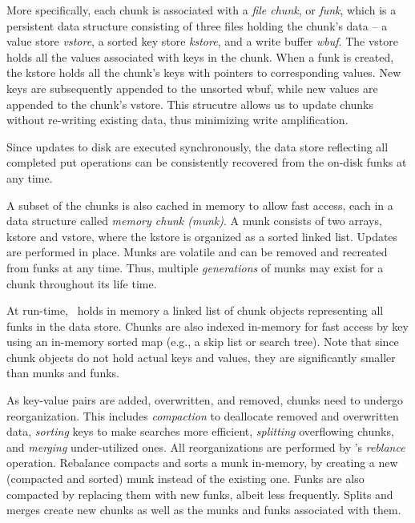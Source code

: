 More specifically, each chunk is associated with a \emph{file chunk}, or \emph{funk},
which is a persistent data structure consisting of three files holding the chunk's data -- a value store \emph{vstore}, 
a sorted key store \emph{kstore}, and a write buffer \emph{wbuf}. The vstore holds all the values associated with keys
in the chunk. When a funk is created, the kstore holds all the chunk's keys with pointers to corresponding values.
New keys are subsequently appended to the unsorted wbuf, while new values are appended to the chunk's vstore.
This strucutre allows us to update chunks without re-writing existing data, thus minimizing write amplification.

Since updates to disk are executed synchronously,  the data store reflecting all completed put operations 
can be consistently recovered from the on-disk funks at any time. 

A subset of the chunks is also cached in memory to allow fast access, each in a data structure called \emph{memory chunk (munk)}. 
A munk consists of two arrays, kstore and vstore, where the kstore is organized as a sorted linked list. 
Updates are performed in place. Munks are volatile and can be removed and recreated from funks at any time.
Thus, multiple \emph{generations} of munks may exist for a chunk throughout its life time.

At run-time, \sys\ holds in memory a linked list of chunk objects representing all funks in the data store. 
Chunks are also indexed in-memory for fast access by key using an in-memory sorted map (e.g., a skip list or search tree).
Note that since chunk objects do not hold actual keys and values, they are significantly smaller than munks and funks. 

As key-value pairs are added, overwritten, and removed, chunks need to undergo reorganization. This includes  
\emph{compaction} to deallocate removed and overwritten data, 
\emph{sorting} keys to make searches more efficient,  
\emph{splitting} overflowing chunks, and
\emph{merging} under-utilized ones.
All reorganizations are performed by \sys's \emph{reblance} operation.
Rebalance compacts and sorts a munk in-memory, by creating a new (compacted and sorted) munk instead of the existing one. 
Funks are also compacted by replacing them with new funks, albeit less frequently.
Splits and merges create new chunks as well as the munks and funks associated with them.

